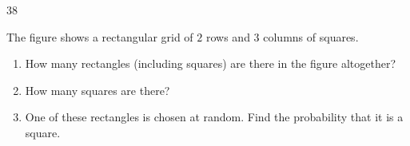 \begin{probbox}{38}{}
\begin{minipage}[t]{0.62\linewidth}\vspace{0pt}
The figure shows a rectangular grid of $2$ rows and $3$ columns of squares.
\begin{enumerate}[label=\alph*),leftmargin=1.5em,itemsep=0pt,topsep=2pt]
\item How many rectangles (including squares) are there in the figure altogether?
\item How many squares are there?
\item One of these rectangles is chosen at random. Find the probability that it is a square.
\end{enumerate}
\end{minipage}\hfill
\begin{minipage}[t]{0.34\linewidth}\vspace{0pt}
\centering{}
\end{minipage}
\end{probbox}
